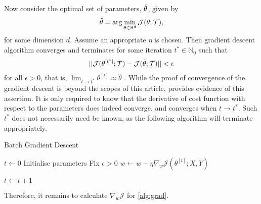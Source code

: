 Now consider the optimal set of parameters, $\Hat{\theta}$, given by
\begin{align*}
    \Hat{\theta} =\arg\min_{\theta\in\mathbb{R}^d} \mathcal{J}(\theta;\mathcal{T}),
\end{align*}
for some dimension $d$. Assume an appropriate $\eta$ is chosen. Then gradient descent algorithm converges and terminates for some iteration $t^*\in \mathbb{N}_0$ such that 
\begin{align*}
    || \mathcal{J}(\theta^{[t^*]};\mathcal{T}) - \mathcal{J}(\Hat{\theta};\mathcal{T}) || < \epsilon
\end{align*}
for all $\epsilon>0$, that is, 
$
    \lim_{t \rightarrow t^*} \theta^{[t]} \approx \hat{\theta}
$ \parencite{sum8789696}.
While the proof of convergence of the gradient descent is beyond the scopes of this article, \textcite{converge} provides evidence of this assertion. It is only required to know that the derivative of cost function with respect to the parameters does indeed converge, and converges when $t\rightarrow t^*$.  Such $t^*$ does not necessarily need be known, as the following algorithm \parencite[8]{Zhanggradient} will terminate appropriately. 
\begin{algorithm}[H]
    \caption{Batch Gradient Descent}
    \begin{algorithmic}[1]
        \Ensure{ $\theta^{[t^*]}$ }
        \State $t\leftarrow 0$
        \State Initialise parameters
        \State Fix $\epsilon > 0$
                    \State $w\leftarrow w-\eta \nabla_w \mathcal{J}(\theta^{[t]};X,Y)$
                   
                \EndFor
            \EndFor
            \State $t\leftarrow t+1$
        \EndWhile 
    \end{algorithmic}
    \label{alg:grad}
\end{algorithm}
Therefore, it remains to calculate $\nabla_w \mathcal{J}$ for  \cref{alg:grad}. 


